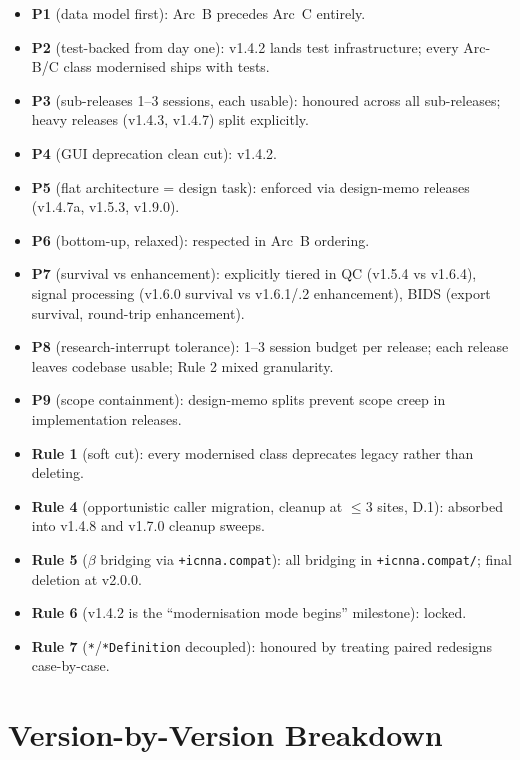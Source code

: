 \documentclass[11pt,a4paper]{article}
\begin{document}
\begin{itemize}[nosep]
    \item \textbf{P1} (data model first): Arc~B precedes Arc~C entirely.
    \item \textbf{P2} (test-backed from day one): v1.4.2 lands test infrastructure; every Arc-B/C class modernised ships with tests.
    \item \textbf{P3} (sub-releases 1--3 sessions, each usable): honoured across all sub-releases; heavy releases (v1.4.3, v1.4.7) split explicitly.
    \item \textbf{P4} (GUI deprecation clean cut): v1.4.2.
    \item \textbf{P5} (flat architecture = design task): enforced via design-memo releases (v1.4.7a, v1.5.3, v1.9.0).
    \item \textbf{P6} (bottom-up, relaxed): respected in Arc~B ordering.
    \item \textbf{P7} (survival vs enhancement): explicitly tiered in QC (v1.5.4 vs v1.6.4), signal processing (v1.6.0 survival vs v1.6.1/.2 enhancement), BIDS (export survival, round-trip enhancement).
    \item \textbf{P8} (research-interrupt tolerance): 1--3 session budget per release; each release leaves codebase usable; Rule 2 mixed granularity.
    \item \textbf{P9} (scope containment): design-memo splits prevent scope creep in implementation releases.
    \item \textbf{Rule 1} (soft cut): every modernised class deprecates legacy rather than deleting.
    \item \textbf{Rule 4} (opportunistic caller migration, cleanup at $\leq 3$ sites, D.1): absorbed into v1.4.8 and v1.7.0 cleanup sweeps.
    \item \textbf{Rule 5} ($\beta$ bridging via \texttt{+icnna.compat}): all bridging in \texttt{+icnna.compat/}; final deletion at v2.0.0.
    \item \textbf{Rule 6} (v1.4.2 is the ``modernisation mode begins'' milestone): locked.
    \item \textbf{Rule 7} (\texttt{*}/\texttt{*Definition} decoupled): honoured by treating paired redesigns case-by-case.
\end{itemize}

\section{Version-by-Version Breakdown}
\end{document}
